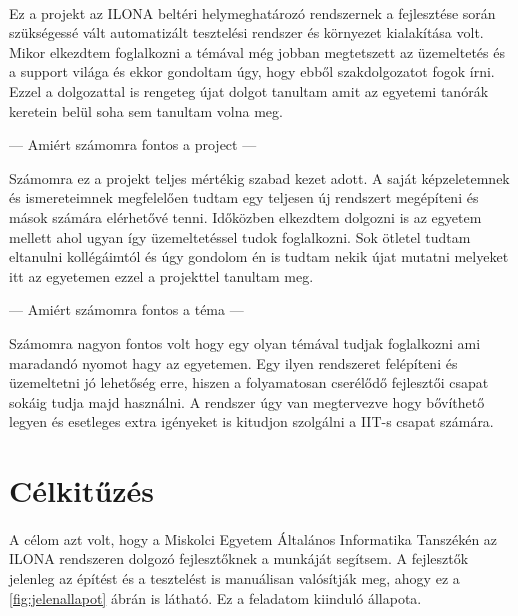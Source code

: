 \paragraph{}
Ez a projekt az ILONA beltéri helymeghatározó rendszernek a fejlesztése során szükségessé vált automatizált tesztelési rendszer és környezet kialakítása volt. 
Mikor elkezdtem foglalkozni a témával még jobban megtetszett az üzemeltetés és a support világa és ekkor gondoltam úgy, hogy ebből szakdolgozatot fogok írni. 
Ezzel a dolgozattal is rengeteg újat dolgot tanultam amit az egyetemi tanórák keretein belül soha sem tanultam volna meg. 

--- Amiért számomra fontos a project ---

Számomra ez a projekt teljes mértékig szabad kezet adott.
A saját képzeletemnek és ismereteimnek megfelelően tudtam egy teljesen új rendszert megépíteni és mások számára elérhetővé tenni.
Időközben elkezdtem dolgozni is az egyetem mellett ahol ugyan így üzemeltetéssel tudok foglalkozni.
Sok ötletel tudtam eltanulni kollégáimtól és úgy gondolom én is tudtam nekik újat mutatni melyeket itt az egyetemen ezzel a projekttel tanultam meg.

--- Amiért számomra fontos a téma ---

Számomra nagyon fontos volt hogy egy olyan témával tudjak foglalkozni ami maradandó nyomot hagy az egyetemen.
Egy ilyen rendszeret felépíteni és üzemeltetni jó lehetőség erre, hiszen a folyamatosan cserélődő fejlesztői csapat sokáig tudja majd használni.
A rendszer úgy van megtervezve hogy bővíthető legyen és esetleges extra igényeket is kitudjon szolgálni a IIT-s csapat számára.


\pagebreak
\section{Célkitűzés}
\paragraph{}
A célom azt volt, hogy a Miskolci Egyetem Általános Informatika Tanszékén az ILONA rendszeren dolgozó fejlesztőknek a munkáját segítsem. 
A fejlesztők jelenleg az építést és a tesztelést is manuálisan valósítják meg, ahogy ez a \ref{fig:jelenallapot} ábrán is látható. Ez a feladatom kiinduló állapota. 

